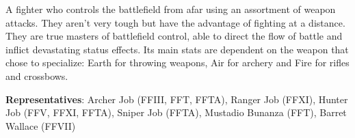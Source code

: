 \begin{jobdesc}[name=pjob-archer]
    A fighter who controls the battlefield from afar using an assortment of weapon attacks. They aren't very tough but have the advantage of fighting at a distance. They are true masters of battlefield control, able to direct the flow of battle and inflict devastating status effects. Its main stats are dependent on the weapon that chose to specialize: Earth for throwing weapons, Air for archery and Fire for rifles and crossbows. \pc%

    \textbf{Representatives}: Archer Job (FFIII, FFT, FFTA), Ranger Job (FFXI), Hunter Job (FFV, FFXI, FFTA), Sniper Job (FFTA), Mustadio Bunanza (FFT), Barret Wallace (FFVII) \pc%

    \jobstats[hpa=4x,hpb=5x,hpc=6x,hpd=7x,mpa=0x,mpc=1x,armor=Medium,
    weapons=Claws/Gloves \\ Bows \\ Rifles / Crossbows \\ Throwing Weapons]
\end{jobdesc}

